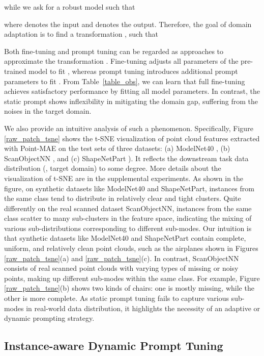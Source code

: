 \documentclass[10pt,twocolumn,letterpaper]{article}
\begin{document}
while we ask for a robust model such that 

where  denotes the input and  denotes the output. 
Therefore, the goal of domain adaptation is to find a transformation , such that 


Both fine-tuning and prompt tuning can be regarded as approaches to approximate the transformation . Fine-tuning adjusts all parameters of the pre-trained model to fit , whereas prompt tuning introduces additional prompt parameters to fit . From Table~\ref{table_obs}, we can learn that full fine-tuning achieves satisfactory performance by fitting all model parameters. In contrast, the static prompt shows inflexibility in mitigating the domain gap, suffering from the noises in the target domain.

We also provide an intuitive analysis of such a phenomenon. 
Specifically, Figure \ref{raw_patch_tsne} shows the t-SNE \cite{van2008visualizing} visualization of point cloud features extracted with Point-MAE \cite{pang2022masked} on the test sets of three datasets: (a) ModelNet40 \cite{wu20153d}, (b) ScanObjectNN \cite{uy2019revisiting}, and (c) ShapeNetPart \cite{yi2016scalable}).
It reflects the downstream task data distribution (\ie, target domain) to some degree. More details about the visualization of t-SNE are in the supplemental experiments.
As shown in the figure, on synthetic datasets like ModelNet40 and ShapeNetPart, instances from the same class tend to distribute in relatively clear and tight clusters. 
Quite differently on the real scanned dataset ScanObjectNN, instances from the same class scatter to many sub-clusters in the feature space, indicating the mixing of various sub-distributions corresponding to different sub-modes. 
Our intuition is that synthetic datasets like ModelNet40 and ShapeNetPart contain complete, uniform, and relatively clean point clouds, such as the airplanes shown in Figures \ref{raw_patch_tsne}(a) and \ref{raw_patch_tsne}(c). 
In contrast, ScanObjectNN consists of real scanned point clouds with varying types of missing or noisy points, making up different sub-modes within the same class. 
For example, Figure \ref{raw_patch_tsne}(b) shows two kinds of chairs: one is mostly missing, while the other is more complete. 
As static prompt tuning fails to capture various sub-modes in real-world data distribution, it highlights the necessity of an adaptive or dynamic prompting strategy. 


\subsection{Instance-aware Dynamic Prompt Tuning}
\label{subsec:idpt}
\end{document}
